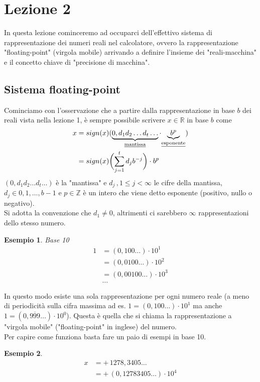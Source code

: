 \documentclass[12pt]{article}
\newtheorem*{esempio}{Esempio}
\begin{document}
\section*{Lezione 2}
In questa lezione cominceremo ad occuparci dell'effettivo sistema di rappresentazione dei numeri reali nel calcolatore, ovvero la rappresentazione "floating-point" (virgola mobile) arrivando a definire l'insieme dei "reali-macchina" e il concetto chiave di "precisione di macchina".
\subsection*{Sistema floating-point}
Cominciamo con l'osservazione che a partire dalla rappresentazione in base $b$ dei reali vista nella lezione 1, è sempre possibile scrivere $x \in \mathbb{R}$ in base $b$ come 
\[ \begin{split}
    x & = sign(x)( \underbrace{0,d_1 d_2 \dotsc d_t \dotsc}_{\text {\underline{mantissa}}} \cdot {\underbrace{b^p}_{\text{\underline{esponente}}}}) \\
    & = sign(x)\biggl( \sum_{j=1}^t d_j b^{-j} \biggr) \cdot b^p
\end{split} \]
$(0,d_1 d_2 \dotsc d_t \dotsc)$ è la "mantissa" e $d_j\, , 1 \le j < \infty$ le cifre della mantissa, $d_j \in {0, 1, \dotsc , b-1}$ e $p \in \mathbb{Z}$ è un intero che viene detto esponente (positivo, nullo o negativo). \\
Si adotta la convenzione che $d_1 \ne 0$, altrimenti ci sarebbero $\infty$ rappresentazioni dello stesso numero.
\begin{esempio}
Base 10
\[ \begin{split}
    1 & = (0,100 \dotsc) \cdot 10^1 \\
    & = (0,0100 \dotsc) \cdot 10^2 \\
    & = (0,00100 \dotsc) \cdot 10^3 \\
    & \dotsc
\end{split}\]
\end{esempio}
In questo modo esiste una sola rappresentazione per ogni numero reale (a meno di periodicità sulla cifra massima ad es. $1 = (0,100 \dotsc) \cdot 10^1$ ma anche $1 = (0,\overline{999} \dotsc) \cdot 10^0$). Questa è quella che si chiama la rappresentazione a "virgola mobile" ("floating-point" in inglese) del numero. \\
Per capire come funziona basta fare un paio di esempi in base 10.
\begin{esempio}
\[\begin{split}
    x & = + \, 1278,3405 \dotsc \\
    & = + \, (0,12783405 \dotsc) \cdot 10^4 
\end{split}\]
\end{esempio}
\end{document}

